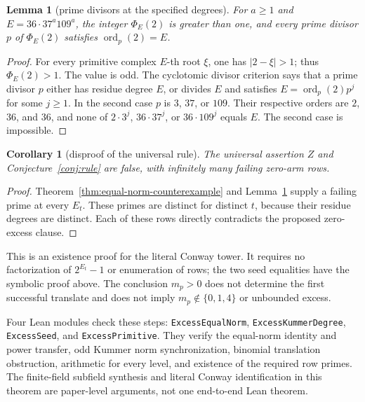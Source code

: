 \documentclass[11pt]{article}
\newtheorem{lemma}[theorem]{Lemma}
\newtheorem{corollary}[theorem]{Corollary}
\theoremstyle{definition}
\theoremstyle{remark}
\begin{document}
\begin{lemma}[prime divisors at the specified degrees]
\label{lem:equal-norm-primitive}
For $a\geq1$ and $E=36\cdot37^a109^a$, the integer $\Phi_E(2)$ is greater
than one, and every prime divisor $p$ of $\Phi_E(2)$ satisfies
$\operatorname{ord}_p(2)=E$.
\end{lemma}

\begin{proof}
For every primitive complex $E$-th root $\xi$, one has $|2-\xi|>1$;
thus $\Phi_E(2)>1$.  The value is odd.  The cyclotomic divisor criterion
says that a prime divisor $p$ either has residue degree $E$, or divides
$E$ and satisfies $E=\operatorname{ord}_p(2)p^j$ for some $j\geq1$.
In the second case $p$ is $3$, $37$, or $109$.  Their respective orders are
$2$, $36$, and $36$, and none of $2\cdot3^j$, $36\cdot37^j$, or
$36\cdot109^j$ equals $E$.  The second case is impossible.
\end{proof}

\begin{corollary}[disproof of the universal rule]
\label{cor:rule-false}
The universal assertion $Z$ and Conjecture~\ref{conj:rule} are false,
with infinitely many failing zero-arm rows.
\end{corollary}

\begin{proof}
Theorem~\ref{thm:equal-norm-counterexample} and
Lemma~\ref{lem:equal-norm-primitive} supply a failing prime at every $E_t$.
These primes are distinct for distinct $t$, because their residue degrees
are distinct.  Each of these rows directly contradicts the proposed zero-excess clause.
\end{proof}

This is an existence proof for the literal Conway tower.  It requires no
factorization of $2^{E_t}-1$ or enumeration of rows; the two seed equalities
have the symbolic proof above.  The conclusion $m_p>0$ does
not determine the first successful translate and does not imply
$m_p\notin\{0,1,4\}$ or unbounded excess.

Four Lean modules check these steps:
\texttt{ExcessEqualNorm}, \texttt{ExcessKummerDegree},
\texttt{ExcessSeed}, and \texttt{ExcessPrimitive}. They verify the equal-norm
identity and power transfer, odd Kummer norm synchronization, binomial
translation obstruction, arithmetic for every level, and existence of the
required row primes.  The
finite-field subfield synthesis and literal Conway identification in this
theorem are paper-level arguments, not one end-to-end Lean theorem.
\end{document}
